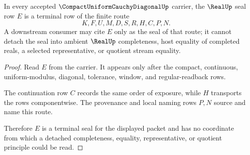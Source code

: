 \begin{theorem}
\label{thm:compact-uniform-cauchy-diagonal-real-seal-nonescape}
In every accepted $\CompactUniformCauchyDiagonalUp$ carrier, the $\RealUp$ seal row $E$ is a terminal row of the finite route
$$
K,F,U,M,D,S,R,H,C,P,N .
$$
A downstream consumer may cite $E$ only as the seal of that route; it cannot detach the seal into ambient $\RealUp$ completeness, host equality of completed reals, a selected representative, or quotient stream equality.
\end{theorem}
\begin{proof}
Read $E$ from the carrier. It appears only after the compact, continuous, uniform-modulus, diagonal, tolerance, window, and regular-readback rows.

The continuation row $C$ records the same order of exposure, while $H$ transports the rows componentwise. The provenance and local naming rows $P,N$ source and name this route.

Therefore $E$ is a terminal seal for the displayed packet and has no coordinate from which a detached completeness, equality, representative, or quotient principle could be read.
\end{proof}




